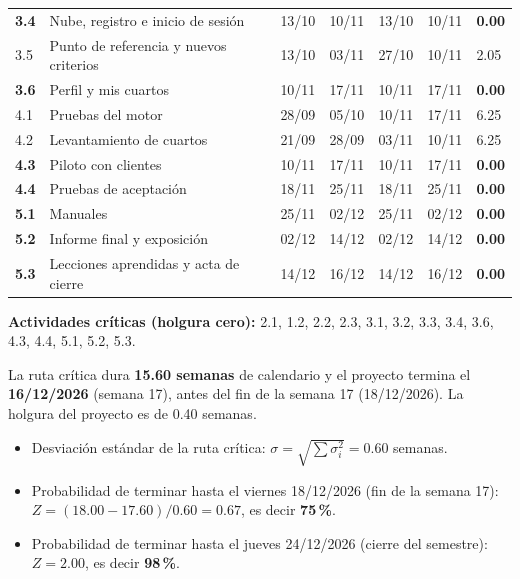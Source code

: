 \documentclass[11pt,a4paper]{article}
\begin{document}
{\begin{longtable}{@{}P{0.75cm} >{\raggedright\arraybackslash}p{5.2cm} C{1.6cm} C{1.6cm} C{1.6cm} C{1.6cm} Q{1.3cm}@{}}
\textbf{3.4} & Nube, registro e inicio de sesión & 13/10 & 10/11 & 13/10 & 10/11 & \textcolor{RaciR}{\textbf{0.00}} \\
3.5 & Punto de referencia y nuevos criterios & 13/10 & 03/11 & 27/10 & 10/11 & 2.05 \\
\textbf{3.6} & Perfil y mis cuartos & 10/11 & 17/11 & 10/11 & 17/11 & \textcolor{RaciR}{\textbf{0.00}} \\
4.1 & Pruebas del motor & 28/09 & 05/10 & 10/11 & 17/11 & 6.25 \\
4.2 & Levantamiento de cuartos & 21/09 & 28/09 & 03/11 & 10/11 & 6.25 \\
\textbf{4.3} & Piloto con clientes & 10/11 & 17/11 & 10/11 & 17/11 & \textcolor{RaciR}{\textbf{0.00}} \\
\textbf{4.4} & Pruebas de aceptación & 18/11 & 25/11 & 18/11 & 25/11 & \textcolor{RaciR}{\textbf{0.00}} \\
\textbf{5.1} & Manuales & 25/11 & 02/12 & 25/11 & 02/12 & \textcolor{RaciR}{\textbf{0.00}} \\
\textbf{5.2} & Informe final y exposición & 02/12 & 14/12 & 02/12 & 14/12 & \textcolor{RaciR}{\textbf{0.00}} \\
\textbf{5.3} & Lecciones aprendidas y acta de cierre & 14/12 & 16/12 & 14/12 & 16/12 & \textcolor{RaciR}{\textbf{0.00}} \\
\end{longtable}
}

\vspace{0.1cm}
\noindent\textbf{Actividades críticas (holgura cero):} 2.1, 1.2, 2.2, 2.3, 3.1, 3.2, 3.3, 3.4, 3.6, 4.3, 4.4, 5.1, 5.2, 5.3.

\vspace{0.1cm}
\noindent La ruta crítica dura \textbf{15.60 semanas} de calendario y el proyecto termina el \textbf{16/12/2026} (semana 17), antes del fin de la semana 17 (18/12/2026). La holgura del proyecto es de 0.40 semanas.

\begin{itemize}[leftmargin=*]
    \item Desviación estándar de la ruta crítica: $\sigma = \sqrt{\sum \sigma_i^2} = 0.60$ semanas.
    \item Probabilidad de terminar hasta el viernes 18/12/2026 (fin de la semana 17): $Z = (18.00 - 17.60)/0.60 = 0.67$, es decir \textbf{75\,\%}.
    \item Probabilidad de terminar hasta el jueves 24/12/2026 (cierre del semestre): $Z = 2.00$, es decir \textbf{98\,\%}.
\end{itemize}
\end{document}
